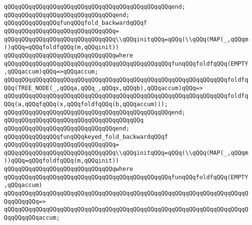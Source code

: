 \verb|qQQqqQQqqQQqqQQqqQQqqQQqqQQqqQQqqQQqqQQqqQQqqQQqend;|\newline
\verb|qQQqqQQqqQQqqQQqqQQqqQQqqQQqqQQqend;|\newline
\newline
\verb|qQQqqQQqqQQqqQQqfunqQQqfold_backwardqQQqf|\newline
\verb|qQQqqQQqqQQqqQQqqQQqqQQqqQQqqQQq=|\newline
\verb|qQQqqQQqqQQqqQQqqQQqqQQqqQQqqQQq\\qQQqinitqQQq=qQQq(\\qQQq(MAP(_,qQQqm))qQQq=qQQqfoldfqQQq(m,qQQqinit))|\newline
\verb|qQQqqQQqqQQqqQQqqQQqqQQqqQQqqQQqwhere|\newline
\verb|qQQqqQQqqQQqqQQqqQQqqQQqqQQqqQQqqQQqqQQqqQQqqQQqfunqQQqfoldfqQQq(EMPTY,qQQqaccum)qQQq=>qQQqaccum;|\newline
\verb|qQQqqQQqqQQqqQQqqQQqqQQqqQQqqQQqqQQqqQQqqQQqqQQqqQQqqQQqqQQqqQQqfoldfqQQq(TREE_NODE(_,qQQqa,qQQq_,qQQqx,qQQqb),qQQqaccum)qQQq=>|\newline
\verb|qQQqqQQqqQQqqQQqqQQqqQQqqQQqqQQqqQQqqQQqqQQqqQQqqQQqqQQqqQQqqQQqfoldfqQQq(a,qQQqfqQQq(x,qQQqfoldfqQQq(b,qQQqaccum)));|\newline
\verb|qQQqqQQqqQQqqQQqqQQqqQQqqQQqqQQqqQQqqQQqqQQqqQQqend;|\newline
\verb|qQQqqQQqqQQqqQQqqQQqqQQqqQQqqQQqqQQqqQQq|\newline
\verb|qQQqqQQqqQQqqQQqqQQqqQQqqQQqqQQqend;|\newline
\newline
\verb|qQQqqQQqqQQqqQQqfunqQQqkeyed_fold_backwardqQQqf|\newline
\verb|qQQqqQQqqQQqqQQqqQQqqQQqqQQqqQQq=|\newline
\verb|qQQqqQQqqQQqqQQqqQQqqQQqqQQqqQQq\\qQQqinitqQQq=qQQq(\\qQQq(MAP(_,qQQqm))qQQq=qQQqfoldfqQQq(m,qQQqinit))|\newline
\verb|qQQqqQQqqQQqqQQqqQQqqQQqqQQqqQQqwhere|\newline
\verb|qQQqqQQqqQQqqQQqqQQqqQQqqQQqqQQqqQQqqQQqqQQqqQQqfunqQQqfoldfqQQq(EMPTY,qQQqaccum)|\newline
\verb|qQQqqQQqqQQqqQQqqQQqqQQqqQQqqQQqqQQqqQQqqQQqqQQqqQQqqQQqqQQqqQQqqQQqqQQqqQQqqQQq=>|\newline
\verb|qQQqqQQqqQQqqQQqqQQqqQQqqQQqqQQqqQQqqQQqqQQqqQQqqQQqqQQqqQQqqQQqqQQqqQQqqQQqqQQqaccum;|\newline
\newline
